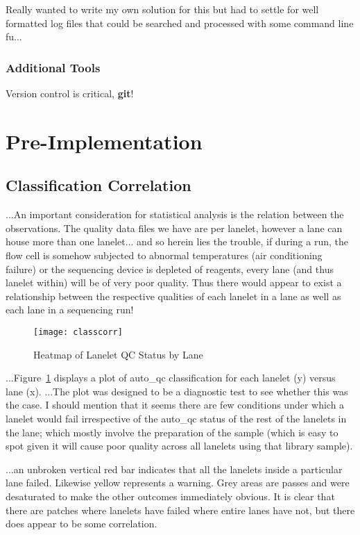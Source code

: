 Really wanted to write my own solution for this but had to settle for well
formatted log files that could be searched and processed with some command line
fu...

\subsubsection{Additional Tools}
Version control is critical, \textbf{git}!


\section{Pre-Implementation}
\subsection{Classification Correlation}
...An important consideration for statistical analysis is the relation between the
observations. The quality data files we have are per lanelet, however a lane can
house more than one lanelet...  and so herein lies the trouble, if during a run,
the flow cell is somehow subjected to abnormal temperatures (air conditioning
failure) or the sequencing device is depleted of reagents, every lane (and thus
lanelet within) will be of very poor quality. Thus there would appear to exist a
relationship between the respective qualities of each lanelet in a lane as well
as each lane in a sequencing run!

\begin{figure}[htbp!]
    \centering
    \texttt{[image: classcorr]}
    \caption[ClassCorr]{Heatmap of Lanelet QC Status by Lane}
    \label{fig:classcorr}
\end{figure}

...Figure~\ref{fig:classcorr} displays a plot of auto\_qc classification for
each lanelet (y) versus lane (x). ...The plot was designed to be a diagnostic
test to see whether this was the case. I should mention that it seems there are
few conditions under which a lanelet would fail irrespective of the auto\_qc
status of the rest of the lanelets in the lane; which mostly involve the
preparation of the sample (which is easy to spot given it will cause poor
quality across all lanelets using that library sample).

...an unbroken vertical red bar indicates that all the lanelets inside a
particular lane failed. Likewise yellow represents a warning. Grey areas are
passes and were desaturated to make the other outcomes immediately obvious. It
is clear that there are patches where lanelets have failed where entire lanes
have not, but there does appear to be some correlation.

